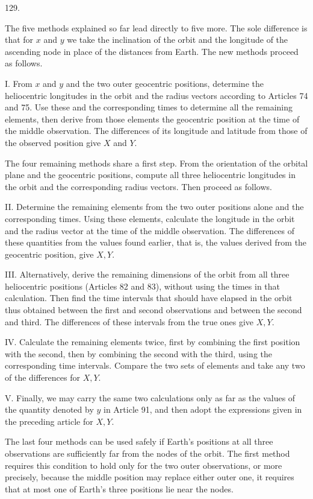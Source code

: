 \par{}\medskip
\begin{center}\hypertarget{native-176-article129}{}129.\end{center}
The five methods explained so far lead directly to five more. The sole difference is that for
$x$ and $y$ we take the inclination of the orbit and the longitude of the ascending node in place of
the distances from Earth. The new methods proceed as follows.

I. From $x$ and $y$ and the two outer geocentric positions, determine the heliocentric longitudes in
the orbit and the radius vectors according to Articles 74 and 75. Use these and the corresponding
times to determine all the remaining elements, then derive from those elements the geocentric
position at the time of the middle observation. The differences of its longitude and latitude from
those of the observed position give $X$ and $Y$.

The four remaining methods share a first step. From the orientation of the orbital plane and the
geocentric positions, compute all three heliocentric longitudes in the orbit and the corresponding
radius vectors. Then proceed as follows.

II. Determine the remaining elements from the two outer positions alone and the corresponding times.
Using these elements, calculate the longitude in the orbit and the radius vector at the time of the
middle observation. The differences of these quantities from the values found earlier, that is, the
values derived from the geocentric position, give $X,Y$.

III. Alternatively, derive the remaining dimensions of the orbit from all three heliocentric
positions (Articles 82 and 83), without using the times in that calculation. Then find the time
intervals that should have elapsed in the orbit thus obtained between the first and second
observations and between the second and third. The differences of these intervals from the true ones
give $X,Y$.

IV. Calculate the remaining elements twice, first by combining the first position with the second,
then by combining the second with the third, using the corresponding time intervals. Compare the two
sets of elements and take any two of the differences for $X,Y$.

V. Finally, we may carry the same two calculations only as far as the values of the quantity denoted
by $y$ in Article 91, and then adopt the expressions given in the preceding article for $X,Y$.

The last four methods can be used safely if Earth's positions at all three observations are
sufficiently far from the nodes of the orbit. The first method requires this condition to hold
only for the two outer observations, or more precisely, because the middle position may replace
either outer one, it requires that at most one of Earth's three positions lie near the nodes.
